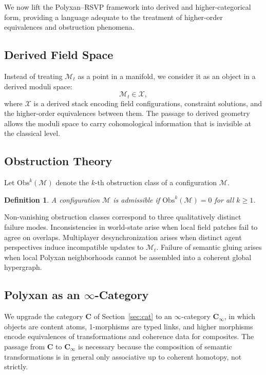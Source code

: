 \documentclass[11pt]{article}
\newtheorem{definition}[theorem]{Definition}
\begin{document}
We now lift the Polyxan--RSVP framework into derived and higher-categorical
form, providing a language adequate to the treatment of higher-order
equivalences and obstruction phenomena.

\subsection{Derived Field Space}

Instead of treating $\mathcal{M}_t$ as a point in a manifold, we consider
it as an object in a derived moduli space:
\[
\mathcal{M}_t \in \mathcal{X},
\]
where $\mathcal{X}$ is a derived stack encoding field configurations,
constraint solutions, and the higher-order equivalences between them.
The passage to derived geometry allows the moduli space to carry
cohomological information that is invisible at the classical level.

\subsection{Obstruction Theory}

Let $\mathrm{Obs}^k(\mathcal{M})$ denote the $k$-th obstruction class of a
configuration $\mathcal{M}$.

\begin{definition}
A configuration $\mathcal{M}$ is admissible if
$\mathrm{Obs}^k(\mathcal{M}) = 0$ for all $k \ge 1$.
\end{definition}

Non-vanishing obstruction classes correspond to three qualitatively distinct
failure modes.
Inconsistencies in world-state arise when local field patches fail to agree
on overlaps.
Multiplayer desynchronization arises when distinct agent perspectives induce
incompatible updates to $\mathcal{M}_t$.
Failure of semantic gluing arises when local Polyxan neighborhoods cannot
be assembled into a coherent global hypergraph.

\subsection{Polyxan as an $\infty$-Category}

We upgrade the category $\mathbf{C}$ of Section~\ref{sec:cat} to an
$\infty$-category $\mathbf{C}_\infty$, in which objects are content atoms,
1-morphisms are typed links, and higher morphisms encode equivalences of
transformations and coherence data for composites.
The passage from $\mathbf{C}$ to $\mathbf{C}_\infty$ is necessary because
the composition of semantic transformations is in general only associative
up to coherent homotopy, not strictly.
\end{document}

